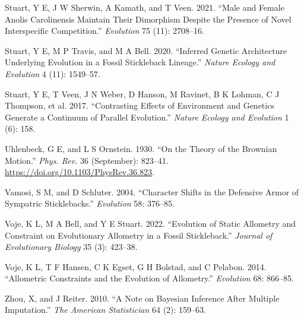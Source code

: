 \documentclass[
  12pt,
]{article}
\newlength{\cslhangindent}
\newlength{\cslentryspacingunit} %
\newenvironment{CSLReferences}[2] %
 {%
  \setlength{\parindent}{0pt}
  \ifodd #1
  \let\oldpar\par
  \def\par{\hangindent=\cslhangindent\oldpar}
  \fi
  \setlength{\parskip}{#2\cslentryspacingunit}
 }%
 {}
\begin{document}
\begin{CSLReferences}{1}{0}
\leavevmode{}%
Stuart, Y E, J W Sherwin, A Kamath, and T Veen. 2021. {``Male and Female
Anolis Carolinensis Maintain Their Dimorphism Despite the Presence of
Novel Interspecific Competition.''} \emph{Evolution} 75 (11): 2708--16.

\leavevmode{}%
Stuart, Y E, M P Travis, and M A Bell. 2020. {``Inferred Genetic
Architecture Underlying Evolution in a Fossil Stickleback Lineage.''}
\emph{Nature Ecology and Evolution} 4 (11): 1549--57.

\leavevmode{}%
Stuart, Y E, T Veen, J N Weber, D Hanson, M Ravinet, B K Lohman, C J
Thompson, et al. 2017. {``Contrasting Effects of Environment and
Genetics Generate a Continuum of Parallel Evolution.''} \emph{Nature
Ecology and Evolution} 1 (6): 158.

\leavevmode{}%
Uhlenbeck, G E, and L S Ornstein. 1930. {``On the Theory of the Brownian
Motion.''} \emph{Phys. Rev.} 36 (September): 823--41.
\url{https://doi.org/10.1103/PhysRev.36.823}.

\leavevmode{}%
Vamosi, S M, and D Schluter. 2004. {``Character Shifts in the Defensive
Armor of Sympatric Sticklebacks.''} \emph{Evolution} 58: 376--85.

\leavevmode{}%
Voje, K L, M A Bell, and Y E Stuart. 2022. {``Evolution of Static
Allometry and Constraint on Evolutionary Allometry in a Fossil
Stickleback.''} \emph{Journal of Evolutionary Biology} 35 (3): 423--38.

\leavevmode{}%
Voje, K L, T F Hansen, C K Egset, G H Bolstad, and C Pelabon. 2014.
{``Allometric Constraints and the Evolution of Allometry.''}
\emph{Evolution} 68: 866--85.

\leavevmode{}%
Zhou, X, and J Reiter. 2010. {``A Note on Bayesian Inference After
Multiple Imputation.''} \emph{The American Statistician} 64 (2):
159--63.

\end{CSLReferences}
\end{document}
